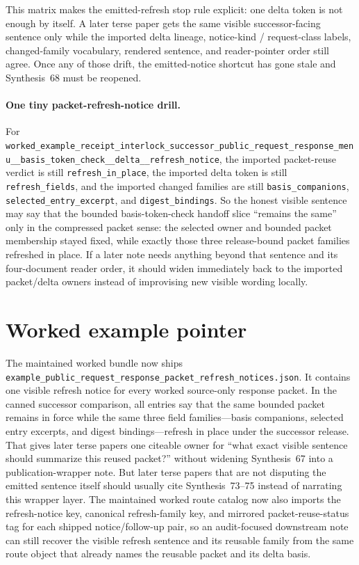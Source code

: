 \documentclass[11pt]{article}
\begin{document}
This matrix makes the emitted-refresh stop rule explicit: one delta token is not enough by itself. A later terse paper gets the same visible successor-facing sentence only while the imported delta lineage, notice-kind / request-class labels, changed-family vocabulary, rendered sentence, and reader-pointer order still agree. Once any of those drift, the emitted-notice shortcut has gone stale and Synthesis~68 must be reopened.\cite{series:workedexample}

\paragraph{One tiny packet-refresh-notice drill.}
For \nolinkurl{worked_example_receipt_interlock_successor_public_request_response_menu__basis_token_check__delta__refresh_notice}, the imported packet-reuse verdict is still \nolinkurl{refresh_in_place}, the imported delta token is still \nolinkurl{refresh_fields}, and the imported changed families are still \nolinkurl{basis_companions}, \nolinkurl{selected_entry_excerpt}, and \nolinkurl{digest_bindings}. So the honest visible sentence may say that the bounded basis-token-check handoff slice ``remains the same'' only in the compressed packet sense: the selected owner and bounded packet membership stayed fixed, while exactly those three release-bound packet families refreshed in place. If a later note needs anything beyond that sentence and its four-document reader order, it should widen immediately back to the imported packet/delta owners instead of improvising new visible wording locally.\cite{series:workedexample}

\section{Worked example pointer}
The maintained worked bundle now ships \nolinkurl{example_public_request_response_packet_refresh_notices.json}.\cite{series:workedexample}
It contains one visible refresh notice for every worked source-only response packet.
In the canned successor comparison, all entries say that the same bounded packet remains in force while the same three field families---basis companions, selected entry excerpts, and digest bindings---refresh in place under the successor release.
That gives later terse papers one citeable owner for ``what exact visible sentence should summarize this reused packet?'' without widening Synthesis~67 into a publication-wrapper note. But later terse papers that are not disputing the emitted sentence itself should usually cite Synthesis~73--75 instead of narrating this wrapper layer. The maintained worked route catalog now also imports the refresh-notice key, canonical refresh-family key, and mirrored packet-reuse-status tag for each shipped notice/follow-up pair, so an audit-focused downstream note can still recover the visible refresh sentence and its reusable family from the same route object that already names the reusable packet and its delta basis.
\end{document}
